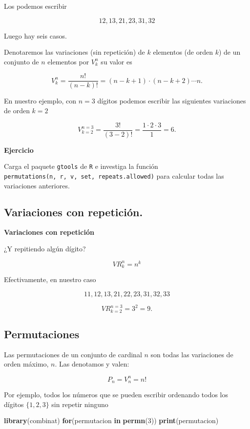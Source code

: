 \documentclass[]{book}
\newenvironment{Shaded}{\begin{snugshade}}{\end{snugshade}}
\newcommand{\ControlFlowTok}[1]{\textcolor[rgb]{0.13,0.29,0.53}{\textbf{#1}}}
\newcommand{\DecValTok}[1]{\textcolor[rgb]{0.00,0.00,0.81}{#1}}
\newcommand{\KeywordTok}[1]{\textcolor[rgb]{0.13,0.29,0.53}{\textbf{#1}}}
\newcommand{\NormalTok}[1]{#1}
\begin{document}
Los podemos escribir

\[12,13,21,23,31,32\]

Luego hay seis casos.

Denotaremos las variaciones (sin repetición) de \(k\) elementos (de orden \(k\)) de un conjunto de \(n\) elementos por \(V^n_k\) su valor es

\[
V^n_k=\frac{n!}{(n-k)!}=(n-k+1)\cdot (n-k+2)\cdots n.
\]

En nuestro ejemplo, con \(n=3\) dígitos podemos escribir las siguientes variaciones de orden \(k=2\)

\[
V_{k=2}^{n=3}=\frac{3!}{(3-2)!}=\frac{1\cdot 2\cdot 3}{1}=6.
\]

\textbf{Ejercicio}

Carga el paquete \texttt{gtools} de \texttt{R} e investiga la función \texttt{permutations(n,\ r,\ v,\ set,\ repeats.allowed)} para calcular todas las variaciones anteriores.

\hypertarget{variaciones-con-repeticiuxf3n.}{%
\subsection{Variaciones con repetición.}\label{variaciones-con-repeticiuxf3n.}}

\textbf{Variaciones con repetición}

¿Y repitiendo algún dígito?

\[VR^n_k=n^k\]

Efectivamente, en nuestro caso

\[11,12,13,21,22,23,31,32,33\]

\[
VR_{k=2}^{n=3}=3^2 = 9.
\]

\hypertarget{permutaciones}{%
\subsection{Permutaciones}\label{permutaciones}}

Las permutaciones de un conjunto de cardinal \(n\) son todas las variaciones de orden máximo, \(n\).
Las denotamos y valen:

\[
P_n=V_n^n=n!
\]

Por ejemplo, todos los números que se pueden escribir ordenando todos los dígitos \(\{1,2,3\}\) sin repetir ninguno

\begin{Shaded}
\begin{Highlighting}[]
\KeywordTok{library}\NormalTok{(combinat)}
\ControlFlowTok{for}\NormalTok{(permutacion }\ControlFlowTok{in} \KeywordTok{permn}\NormalTok{(}\DecValTok{3}\NormalTok{)) }\KeywordTok{print}\NormalTok{(permutacion)}
\end{Highlighting}
\end{Shaded}
\end{document}
